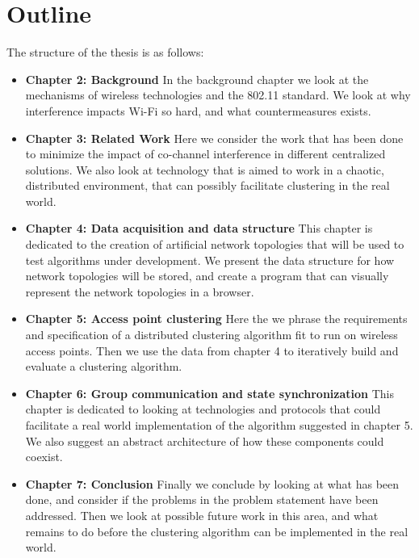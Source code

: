 \section{Outline}
The structure of the thesis is as follows:

\begin{itemize}
	\item \textbf{Chapter 2: Background} \newline
	In the background chapter we look at the mechanisms of wireless technologies and the 802.11 standard. We look at why interference impacts 
		Wi-Fi so hard, and what countermeasures exists.

	\item \textbf{Chapter 3: Related Work} \newline
		Here we consider the work that has been done to minimize the impact of co-channel interference in different centralized solutions.
		We also look at technology that is aimed to work in a chaotic, distributed environment, that can possibly facilitate clustering in the real world.

	\item \textbf{Chapter 4: Data acquisition and data structure} \newline
		This chapter is dedicated to the creation of artificial network topologies that will be used to test algorithms under development.
		We present the data structure for how network topologies will be stored, and create a program that can visually represent the network topologies in a browser.

	\item \textbf{Chapter 5: Access point clustering}\newline
	Here the we phrase the requirements and specification of a distributed clustering algorithm fit to run on wireless access points.
	Then we use the data from chapter 4 to iteratively build and evaluate a clustering algorithm.

	\item \textbf{Chapter 6: Group communication and state synchronization} \newline
	This chapter is dedicated to looking at technologies and protocols that could facilitate a real world implementation of the algorithm suggested in chapter 5. 
	We also suggest an abstract architecture of how these components could coexist. 	

	\item \textbf{Chapter 7: Conclusion} \newline
	Finally we conclude by looking at what has been done, and consider if the problems in the problem statement have been addressed. Then we look at possible
		future work in this area, and what remains to do before the clustering algorithm can be implemented in the real world.  
\end{itemize}
%


